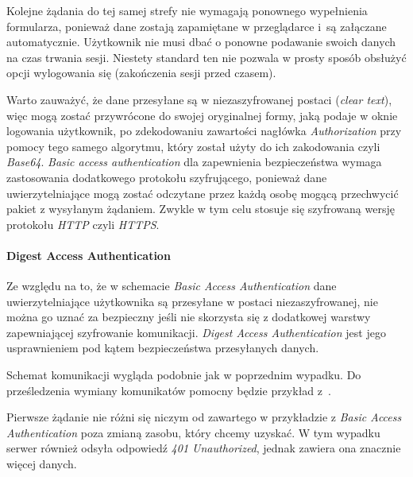\documentclass[11pt]{aghdpl}
\begin{document}
Kolejne żądania do tej samej strefy nie wymagają ponownego wypełnienia formularza, ponieważ dane zostają zapamiętane w przeglądarce i~są załączane automatycznie. Użytkownik nie musi dbać o ponowne podawanie swoich danych na czas trwania sesji. Niestety standard ten nie pozwala w prosty sposób obsłużyć opcji wylogowania się (zakończenia sesji przed czasem).

Warto zauważyć, że dane przesyłane są w niezaszyfrowanej postaci (\emph{clear text}), więc mogą zostać przywrócone do swojej oryginalnej formy, jaką podaje w oknie logowania użytkownik, po zdekodowaniu zawartości nagłówka \emph{Authorization} przy pomocy tego samego algorytmu, który został użyty do ich zakodowania czyli \emph{Base64}. \emph{Basic access authentication} dla zapewnienia bezpieczeństwa wymaga zastosowania dodatkowego protokołu szyfrującego, ponieważ dane uwierzytelniające mogą zostać odczytane przez każdą osobę mogącą przechwycić pakiet z wysyłanym żądaniem. Zwykle w tym celu stosuje się szyfrowaną wersję protokołu \emph{HTTP} czyli \emph{HTTPS}.

\paragraph{Digest Access Authentication}

Ze względu na to, że w schemacie \emph{Basic Access Authentication} dane uwierzytelniające użytkownika są przesyłane w postaci niezaszyfrowanej, nie można go uznać za bezpieczny jeśli nie skorzysta się z dodatkowej warstwy zapewniającej szyfrowanie komunikacji. \emph{Digest Access Authentication} jest jego usprawnieniem pod kątem bezpieczeństwa przesyłanych danych.

Schemat komunikacji wygląda podobnie jak w poprzednim wypadku. Do prześledzenia wymiany komunikatów pomocny będzie przykład z~\cite{BDA99}.

Pierwsze żądanie nie różni się niczym od zawartego w przykładzie z \emph{Basic Access Authentication} poza zmianą zasobu, który chcemy uzyskać. W tym wypadku serwer również odsyła odpowiedź \emph{401 Unauthorized}, jednak zawiera ona znacznie więcej danych.
\end{document}
